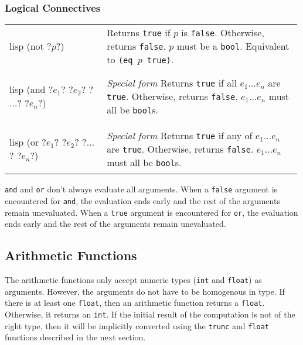 \documentclass[a4paper, 12pt]{article}
\makeatletter
\newenvironment{funcdefs}
    {\begin{longtable}{@{} x{0.33\linewidth} @{} >{\raggedright\arraybackslash}p{0.66\linewidth} @{}}}
    {\end{longtable}}
\def\specialf/{\textit{Special form}\hspace{0.5em}}
\makeatother
\begin{document}
\subsubsection{Logical Connectives}
\begin{funcdefs}
    \begin{minipage}[t]{\linewidth}
        \centering
        \begin{cminted}[autogobble=true, escapeinside=??]{lisp}
            (not ?$p$?)
        \end{cminted}
    \end{minipage}
    & Returns \texttt{true} if $p$ is \texttt{false}. Otherwise, returns \texttt{false}. $p$ must be a \texttt{bool}. Equivalent to \texttt{(eq $p$ true)}.
    \\ \\
    \begin{minipage}[t]{\linewidth}
        \centering
        \begin{cminted}[autogobble=true, escapeinside=??]{lisp}
            (and ?$e_1$? ?$e_2$? ?$\ldots$? ?$e_n$?)
        \end{cminted}
    \end{minipage}
    & \specialf/ Returns \texttt{true} if all $e_1 \ldots e_n$ are \texttt{true}. Otherwise, returns \texttt{false}. $e_1 \ldots e_n$ must all be \texttt{bool}s.
    \\ \\
    \begin{minipage}[t]{\linewidth}
        \centering
        \begin{cminted}[autogobble=true, escapeinside=??]{lisp}
            (or ?$e_1$? ?$e_2$? ?$\ldots$? ?$e_n$?)
        \end{cminted}
    \end{minipage}
    & \specialf/ Returns \texttt{true} if any of $e_1 \ldots e_n$ are \texttt{true}. Otherwise, returns \texttt{false}. $e_1 \ldots e_n$ must all be \texttt{bool}s.
\end{funcdefs}

\noindent \texttt{and} and \texttt{or} don't always evaluate all arguments. When a \texttt{false} argument is encountered for \texttt{and}, the evaluation ends early and the rest of the arguments remain unevaluated. When a \texttt{true} argument is encountered for \texttt{or}, the evaluation ends early and the rest of the arguments remain unevaluated.

\subsection{Arithmetic Functions}
The arithmetic functions only accept numeric types (\texttt{int} and \texttt{float}) as arguments. However, the arguments do not have to be homogenous in type. If there is at least one \texttt{float}, then an arithmetic function returns a \texttt{float}. Otherwise, it returns an \texttt{int}. If the initial result of the computation is not of the right type, then it will be implicitly converted using the \texttt{trunc} and \texttt{float} functions described in the next section.
\end{document}
